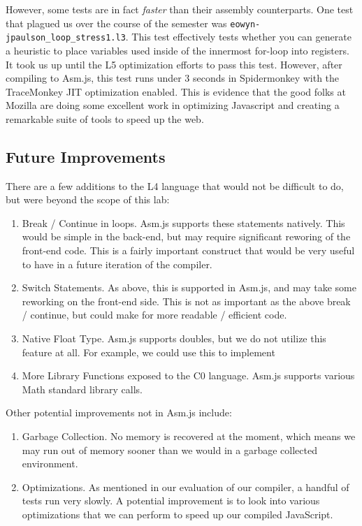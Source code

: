\documentclass[twoside]{article}
\begin{document}
\begin{multicols}{2}
However, some tests are in fact \emph{faster} than their assembly counterparts. One test
that plagued us over the course of the semester was \texttt{eowyn-jpaulson\_loop\_stress1.l3}. 
This test effectively tests whether you can generate a heuristic to place variables used
inside of the innermost for-loop into registers. It took us up until the L5 optimization 
efforts to pass this test. However, after compiling to Asm.js, this test runs under
3 seconds in Spidermonkey with the TraceMonkey JIT optimization enabled. This is evidence
that the good folks at Mozilla are doing some excellent work in optimizing Javascript and
creating a remarkable suite of tools to speed up the web. 

\subsection{Future Improvements}

There are a few additions to the L4 language that would not be difficult
to do, but were beyond the scope of this lab:

\begin{enumerate}
  \item Break / Continue in loops. Asm.js supports these statements natively.
    This would be simple in the back-end, but may require significant reworing of the
    front-end code. This is a fairly important construct that would be very useful
    to have in a future iteration of the compiler.
  \item Switch Statements. As above, this is supported in Asm.js, and may take
    some reworking on the front-end side. This is not as important as the above break
    / continue, but could make for more readable / efficient code.
  \item Native Float Type. Asm.js supports doubles, but we do not utilize this
  feature at all. For example, we could use this to implement 
  \item More Library Functions exposed to the C0 language. Asm.js supports various 
  Math standard library calls.
\end{enumerate}

Other potential improvements not in Asm.js include:

\begin{enumerate}
  \item Garbage Collection. No memory is recovered at the moment, which means
    we may run out of memory sooner than we would in a garbage collected 
    environment. 
  \item Optimizations. As mentioned in our evaluation of our compiler, a handful of tests
    run very slowly. A potential improvement is to look into various optimizations 
    that we can perform to speed up our compiled JavaScript.
\end{enumerate}


\end{multicols}
\end{document}
